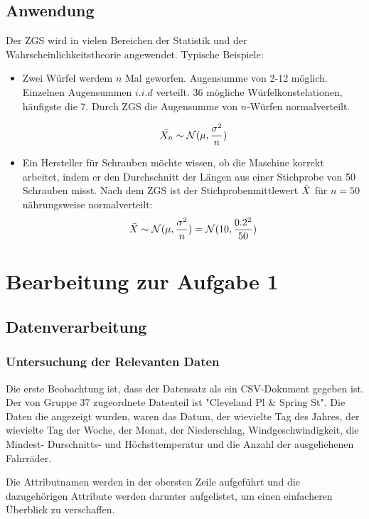 \documentclass{article}
\begin{document}
    
\subsection{Anwendung}
Der ZGS wird in vielen Bereichen der Statistik und der Wahrscheinlichkeitstheorie angewendet. Typische Beispiele:
\begin{itemize}
\item Zwei Würfel werdem $n$ Mal geworfen. Augensumme von 2-12 möglich. Einzelnen Augensummen $i.i.d$ verteilt. 36 mögliche Würfelkonstelationen, häufigste die 7. Durch ZGS die Augensumme von $n$-Würfen normalverteilt.

\begin{equation}
\Bar{X_n}\sim\mathcal{N}(\mu,\frac{\sigma^2}{n})
\end{equation}
\item Ein Hersteller für Schrauben möchte wissen, ob die Maschine korrekt arbeitet, indem er den Durchschnitt der Längen aus einer Stichprobe von 50 Schrauben misst.
Nach dem ZGS ist der Stichprobenmittlewert $\Bar{X}$ für $n = 50$ nährungsweise normalverteilt:
\begin{equation}
    \Bar{X}\sim\mathcal{N}(\mu,\frac{\sigma^2}{n}) = \mathcal{N}(10,\frac{0.2^2}{50})
\end{equation}
\end{itemize}




\section{Bearbeitung zur Aufgabe 1}
\subsection{Datenverarbeitung}

\subsubsection{Untersuchung der Relevanten Daten}
Die erste Beobachtung ist, dass der Datensatz als ein CSV-Dokument gegeben ist. Der von Gruppe 37 zugeordnete Datenteil ist "Cleveland Pl \& Spring St". 
Die Daten die angezeigt wurden, waren das Datum, der wievielte Tag des Jahres, der wievielte Tag der Woche, der Monat, der Niederschlag, Windgeschwindigkeit, 
die Mindest- Durschnitts- und Höchsttemperatur und die Anzahl der ausgeliehenen Fahrräder.

Die Attributnamen werden in der obersten Zeile aufgeführt und die dazugehörigen Attribute werden darunter aufgelistet, um einen einfacheren Überblick zu verschaffen.
\end{document}
